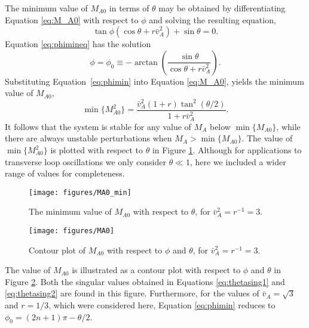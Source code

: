 \documentclass[12pt]{ociamthesis}
\begin{document}
The minimum value of $M_{A0}$ in terms of $\theta$ may be obtained by differentiating Equation \eqref{eq:M_A0} with respect to $\phi$ and solving the resulting equation,
\begin{equation}
\label{eq:phimineq}
\tan\phi(\cos\theta + r \bar v_A^2) + \sin\theta = 0.
\end{equation}
Equation \eqref{eq:phimineq} has the solution
%
\begin{equation}
\label{eq:phimin}
\phi = \phi_0 \equiv -\arctan \left(\frac{ \sin\theta}{\cos\theta + r \bar v_{A}^2}\right).
\end{equation}
%
Substituting Equation~\eqref{eq:phimin} into Equation \eqref{eq:M_A0}, yields the minimum value of $M_{A0}$,
%
\begin{equation}
\label{eq:M_A0min}
\min \{ M_{A0}^2 \} = \frac{\bar v_{A}^2 (1 + r)\tan^2(\theta/2)}{1 + r \bar v_{A}^2} .
\end{equation}
%
It follows that the system is stable for any value of $M_A$ below $\min\{M_{A0}\}$, while there are always unstable perturbations when $M_A > \min\{M_{A0}\}$.
The value of $\min \{ M_{A0}^2 \}$ is plotted with respect to $\theta$ in Figure \ref{fig:M_A0_min}.
Although for applications to transverse loop oscillations we only consider $\theta \ll 1$, here we included a wider range of values for completeness.

\begin{figure}[t]
\centering
\texttt{[image: figures/MA0\_min]}
\caption{The minimum value of $M_{A0}$ with respect to $\theta$, for $\bar v_A^2 = r^{-1} = 3$.}
\label{fig:M_A0_min}
\end{figure}

\begin{figure}[t]
\centering
\texttt{[image: figures/MA0]}
\caption{Contour plot of $M_{A0}$ with respect to $\phi$ and $\theta$, for $\bar v_A^2 = r^{-1} = 3$.}
\label{fig:M_A0}
\end{figure}

The value of $M_{A 0}$ is illustrated as a contour plot with respect to $\phi$ and $\theta$ in Figure \ref{fig:M_A0}.
Both the singular values obtained in Equations \eqref{eq:thetasing1} and \eqref{eq:thetasing2} are found in this figure.
Furthermore, for the values of $\bar v_A = \sqrt{3}$ and $r = 1/3$, which were considered here, Equation \eqref{eq:phimin} reduces to $\phi_0 = (2 n + 1) \pi -\theta/2$.
\end{document}
